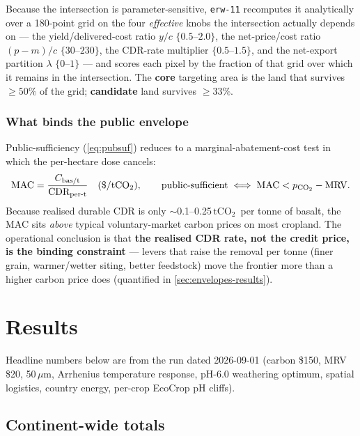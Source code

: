 \documentclass[openany]{book}
\newcommand{\co}{\ensuremath{\mathrm{CO_2}}}
\newcommand{\tco}{\ensuremath{\mathrm{tCO_2}}}
\newcommand{\um}{\ensuremath{\mu\mathrm{m}}}
\begin{document}
Because the intersection is parameter-sensitive, \texttt{erw-11} recomputes it
analytically over a 180-point grid on the four \emph{effective} knobs the
intersection actually depends on --- the yield/delivered-cost ratio $y/c$
$\{0.5\text{--}2.0\}$, the net-price/cost ratio $(p-m)/c$ $\{30\text{--}230\}$,
the CDR-rate multiplier $\{0.5\text{--}1.5\}$, and the net-export partition
$\lambda$ $\{0\text{--}1\}$ --- and scores each pixel by the fraction of that
grid over which it remains in the intersection. The \textbf{core} targeting area
is the land that survives $\ge 50\%$ of the grid; \textbf{candidate} land
survives $\ge 33\%$.

\subsection{What binds the public envelope}

Public-sufficiency (\autoref{eq:pubsuf}) reduces to a marginal-abatement-cost test
in which the per-hectare dose cancels:
%
\begin{equation}
\mathrm{MAC} = \frac{C_{\text{bas/t}}}{\mathrm{CDR_{per\text{-}t}}}
\quad(\text{\$/\tco}),
\qquad \text{public-sufficient} \iff \mathrm{MAC} < p_{\co} - \mathrm{MRV}.
\label{eq:mac}
\end{equation}
%
Because realised durable CDR is only $\sim$0.1--0.25\,\tco\ per tonne of basalt,
the MAC sits \emph{above} typical voluntary-market carbon prices on most
cropland. The operational conclusion is that \textbf{the realised CDR rate, not
the credit price, is the binding constraint} --- levers that raise the removal
per tonne (finer grain, warmer/wetter siting, better feedstock) move the frontier
more than a higher carbon price does (quantified in \autoref{sec:envelopes-results}).

\chapter{Results}\label{ch:results}

Headline numbers below are from the run dated 2026-09-01 (carbon \$150, MRV \$20,
50\,\um, Arrhenius temperature response, pH-6.0 weathering optimum, spatial
logistics, country energy, per-crop EcoCrop pH cliffs).

\section{Continent-wide totals}
\end{document}
